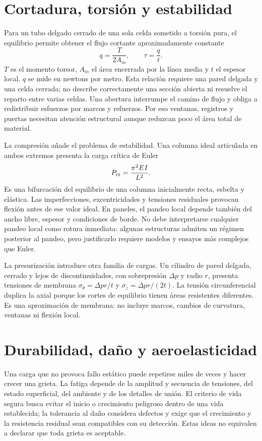 \section{Cortadura, torsión y estabilidad}
Para un tubo delgado cerrado de una sola celda sometido a torsión pura, el equilibrio permite obtener el flujo cortante aproximadamente constante
\begin{equation}
 q=\frac{T}{2A_m},\qquad \tau=\frac{q}{t}.
\end{equation}
$T$ es el momento torsor, $A_m$ el área encerrada por la línea media y $t$ el espesor local. $q$ se mide en newtons por metro. Esta relación requiere una pared delgada y una celda cerrada; no describe correctamente una sección abierta ni resuelve el reparto entre varias celdas. Una abertura interrumpe el camino de flujo y obliga a redistribuir esfuerzos por marcos y refuerzos. Por eso ventanas, registros y puertas necesitan atención estructural aunque reduzcan poco el área total de material.

La compresión añade el problema de estabilidad. Una columna ideal articulada en ambos extremos presenta la carga crítica de Euler
\begin{equation}
 P_{\rm cr}=\frac{\pi^2EI}{L^2}.
\end{equation}
Es una bifurcación del equilibrio de una columna inicialmente recta, esbelta y elástica. Las imperfecciones, excentricidades y tensiones residuales provocan flexión antes de ese valor ideal. En paneles, el pandeo local depende también del ancho libre, espesor y condiciones de borde. No debe interpretarse cualquier pandeo local como rotura inmediata: algunas estructuras admiten un régimen posterior al pandeo, pero justificarlo requiere modelos y ensayos más complejos que Euler.

La presurización introduce otra familia de cargas. Un cilindro de pared delgada, cerrado y lejos de discontinuidades, con sobrepresión $\Delta p$ y radio $r$, presenta tensiones de membrana $\sigma_\theta=\Delta p r/t$ y $\sigma_z=\Delta p r/(2t)$. La tensión circunferencial duplica la axial porque los cortes de equilibrio tienen áreas resistentes diferentes. Es una aproximación de membrana: no incluye marcos, cambios de curvatura, ventanas ni flexión local.

\section{Durabilidad, daño y aeroelasticidad}
Una carga que no provoca fallo estático puede repetirse miles de veces y hacer crecer una grieta. La fatiga depende de la amplitud y secuencia de tensiones, del estado superficial, del ambiente y de los detalles de unión. El criterio de vida segura busca evitar el inicio o crecimiento peligroso dentro de una vida establecida; la tolerancia al daño considera defectos y exige que el crecimiento y la resistencia residual sean compatibles con su detección. Estas ideas no equivalen a declarar que toda grieta es aceptable.

